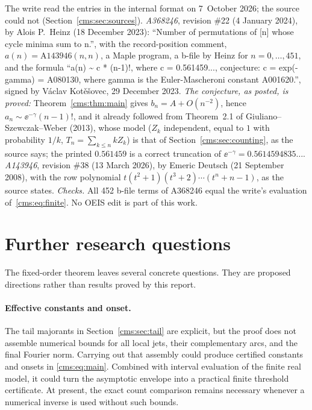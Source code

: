 \begin{remark}\label{cms:rem:oeis}
The write read the entries in the internal format on 7~October 2026; the
source could not (Section~\ref{cms:sec:sources}). \emph{A368246}, revision
\#22 (4 January 2024), by Alois P.\ Heinz (18 December 2023): ``Number of
permutations of [n] whose cycle minima sum to n.'', with the
record-position comment, $a(n)=\mathrm{A143946}(n,n)$, a Maple program, a
b-file by Heinz for $n=0,\ldots,451$, and the formula ``a(n) \textasciitilde{} c * (n-1)!,
where c = 0.561459..., conjecture: c = exp(-gamma) = A080130, where gamma is
the Euler-Mascheroni constant A001620.'', signed by V\'aclav Kot\v{e}\v{s}ovec,
29 December 2023. \emph{The conjecture, as posted, is proved:}
Theorem~\ref{cms:thm:main} gives $b_n=A+O(n^{-2})$, hence
$a_n\sim\ee^{-\gamma}(n-1)!$, and it already followed from Theorem~2.1 of
Giuliano--Szewczak--Weber (2013), whose model ($Z_k$ independent, equal to $1$
with probability $1/k$, $T_n=\sum_{k\le n}kZ_k$) is that of
Section~\ref{cms:sec:counting}, as the source says; the printed $0.561459$ is a
correct truncation of $\ee^{-\gamma}=0.5614594835\ldots$. \emph{A143946},
revision \#38 (13 March 2026), by Emeric Deutsch (21 September 2008), with the
row polynomial $t(t^2+1)(t^3+2)\cdots(t^n+n-1)$, as the source states.
\emph{Checks.} All 452 b-file terms of A368246 equal the write's evaluation
of~\eqref{cms:eq:finite}. No OEIS edit is part of this work.
\end{remark}

\section{Further research questions}\label{cms:sec:questions}
The fixed-order theorem leaves several concrete questions. They are proposed directions rather than results proved by this report.

\paragraph{Effective constants and onset.}
The tail majorants in Section~\ref{cms:sec:tail} are explicit, but the proof does not assemble numerical bounds for all local jets, their complementary arcs, and the final Fourier norm. Carrying out that assembly could produce certified constants and onsets in \eqref{cms:eq:main}. Combined with interval evaluation of the finite real model, it could turn the asymptotic envelope into a practical finite threshold certificate. At present, the exact count comparison remains necessary whenever a numerical inverse is used without such bounds.

